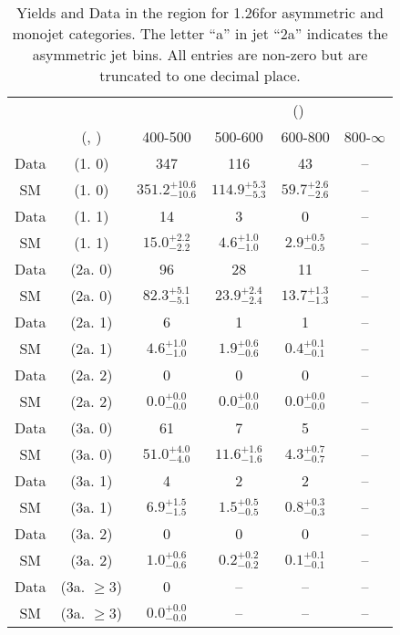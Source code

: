 \begin{table}[h!]
\tiny
\centering
\caption{Yields and Data in the \gj region for 1.26\ifb for asymmetric and monojet categories. The letter ``a'' in jet \eg ``2a''  indicates the asymmetric jet bins. All entries are non-zero but are truncated to one decimal place.\label{tab:yieldsall_gj_comb_asym}}
\begin{tabular}
{cccccc}
	\hline\hline
&	&	& \multicolumn{4}{c}{\scalht (\gev)}\\ 
	&	 (\njet, \nb) & 400-500 & 500-600 & 600-800 & 800-$\infty$ \\ [0.8ex] 
\hline
	Data & (1. 0) & 347 & 116 & 43 & -- \\[0.5ex] 
	SM & (1. 0) & $351.2^{+ 10.6 }_{- 10.6 }$ & $114.9^{+ 5.3 }_{- 5.3 }$ & $59.7^{+ 2.6 }_{- 2.6 }$ & -- \\[0.5ex] 
	Data & (1. 1) & 14 & 3 & 0 & -- \\[0.5ex] 
	SM & (1. 1) & $15.0^{+ 2.2 }_{- 2.2 }$ & $4.6^{+ 1.0 }_{- 1.0 }$ & $2.9^{+ 0.5 }_{- 0.5 }$ & -- \\[0.5ex] 
	Data & (2a. 0) & 96 & 28 & 11 & -- \\[0.5ex] 
	SM & (2a. 0) & $82.3^{+ 5.1 }_{- 5.1 }$ & $23.9^{+ 2.4 }_{- 2.4 }$ & $13.7^{+ 1.3 }_{- 1.3 }$ & -- \\[0.5ex] 
	Data & (2a. 1) & 6 & 1 & 1 & -- \\[0.5ex] 
	SM & (2a. 1) & $4.6^{+ 1.0 }_{- 1.0 }$ & $1.9^{+ 0.6 }_{- 0.6 }$ & $0.4^{+ 0.1 }_{- 0.1 }$ & -- \\[0.5ex] 
	Data & (2a. 2) & 0 & 0 & 0 & -- \\[0.5ex] 
	SM & (2a. 2) & $0.0^{+ 0.0 }_{- 0.0 }$ & $0.0^{+ 0.0 }_{- 0.0 }$ & $0.0^{+ 0.0 }_{- 0.0 }$ & -- \\[0.5ex] 
	Data & (3a. 0) & 61 & 7 & 5 & -- \\[0.5ex] 
	SM & (3a. 0) & $51.0^{+ 4.0 }_{- 4.0 }$ & $11.6^{+ 1.6 }_{- 1.6 }$ & $4.3^{+ 0.7 }_{- 0.7 }$ & -- \\[0.5ex] 
	Data & (3a. 1) & 4 & 2 & 2 & -- \\[0.5ex] 
	SM & (3a. 1) & $6.9^{+ 1.5 }_{- 1.5 }$ & $1.5^{+ 0.5 }_{- 0.5 }$ & $0.8^{+ 0.3 }_{- 0.3 }$ & -- \\[0.5ex] 
	Data & (3a. 2) & 0 & 0 & 0 & -- \\[0.5ex] 
	SM & (3a. 2) & $1.0^{+ 0.6 }_{- 0.6 }$ & $0.2^{+ 0.2 }_{- 0.2 }$ & $0.1^{+ 0.1 }_{- 0.1 }$ & -- \\[0.5ex] 
	Data & (3a. $\ge3$) & 0 & -- & -- & -- \\[0.5ex] 
	SM & (3a. $\ge3$) & $0.0^{+ 0.0 }_{- 0.0 }$ & -- & -- & -- \\[0.5ex] 

\end{tabular}
\end{table}

